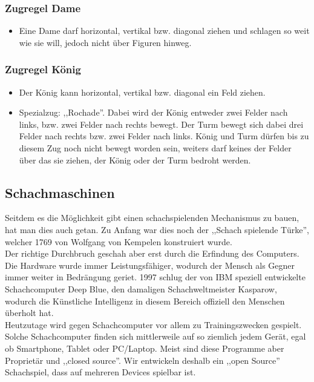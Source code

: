 \documentclass[12pt,a4paper]{article}
\begin{document}
{\subsubsection{Zugregel Dame}
\label{SUBSUBSEC:QUEEN}
\begin{itemize}
	\item{Eine Dame darf horizontal, vertikal bzw. diagonal ziehen und schlagen so weit wie sie will, jedoch nicht über Figuren hinweg.}
\end{itemize}

\subsubsection{Zugregel König}
\label{SUBSUBSEC:KING}
\begin{itemize}
	\item{Der König kann horizontal, vertikal bzw. diagonal ein Feld ziehen.}
	\item{Spezialzug: ,,Rochade''. Dabei wird der König entweder zwei Felder nach links, bzw. zwei Felder nach rechts bewegt. Der Turm bewegt sich dabei drei Felder nach rechts bzw. zwei Felder nach links. König und Turm dürfen bis zu diesem Zug noch nicht bewegt worden sein, weiters darf keines der Felder über das sie ziehen, der König oder der Turm bedroht werden.}
\end{itemize}



\subsection{Schachmaschinen}
\label{SUBSUBSEC:CHESS-COMPUTERS}

Seitdem es die Möglichkeit gibt einen schachspielenden Mechanismus zu bauen, hat man dies auch getan. Zu Anfang war dies noch der ,,Schach spielende Türke'', welcher 1769 von Wolfgang von Kempelen konstruiert wurde. \\ 
Der richtige Durchbruch geschah aber erst durch die Erfindung des Computers. Die Hardware wurde immer Leistungsfähiger, wodurch der Mensch als Gegner immer weiter in Bedrängung geriet. 1997 schlug der von IBM speziell entwickelte Schachcomputer Deep Blue, den damaligen Schachweltmeister Kasparow, wodurch die Künstliche Intelligenz in diesem Bereich offiziell den Menschen überholt hat. \\
Heutzutage wird gegen Schachcomputer vor allem zu Trainingszwecken gespielt. Solche Schachcomputer finden sich mittlerweile auf so ziemlich jedem Gerät, egal ob Smartphone, Tablet oder PC/Laptop. Meist sind diese Programme aber Proprietär und ,,closed source''. Wir entwickeln deshalb ein ,,open Source'' Schachspiel, dass auf mehreren Devices spielbar ist.
 



}
\end{document}
